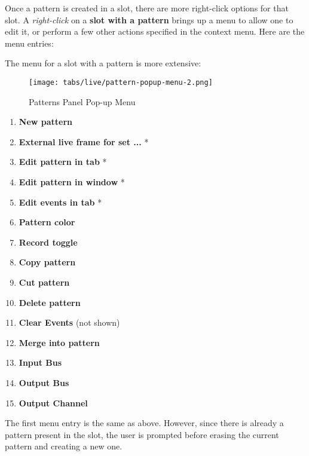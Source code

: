    Once a pattern is created in a slot, there are more
   right-click options for that slot.
   A \textsl{right-click} on a \textbf{slot with a pattern} brings up a menu
   to allow one to edit it, or perform a few other actions
   specified in the context menu.  Here are the menu entries:


   The menu for a slot with a pattern is more extensive:

\begin{figure}[H]
   \centering 
   \texttt{[image: tabs/live/pattern-popup-menu-2.png]}
   \caption{Patterns Panel Pop-up Menu}
   \label{fig:patterns_panel_popup_menu}
\end{figure}

   \begin{enumerate}
      \item \textbf{New pattern}
      \item \textbf{External live frame for set ...} *
      \item \textbf{Edit pattern in tab} *
      \item \textbf{Edit pattern in window} *
      \item \textbf{Edit events in tab} *
      \item \textbf{Pattern color}
      \item \textbf{Record toggle}
      \item \textbf{Copy pattern}
      \item \textbf{Cut pattern}
      \item \textbf{Delete pattern}
      \item \textbf{Clear Events} (not shown)
      \item \textbf{Merge into pattern}
      \item \textbf{Input Bus}
      \item \textbf{Output Bus}
      \item \textbf{Output Channel}
   \end{enumerate}

   The first menu entry is the same as above.  However, since there is
   already a pattern present in the slot, the user is prompted before erasing
   the current pattern and creating a new one.

